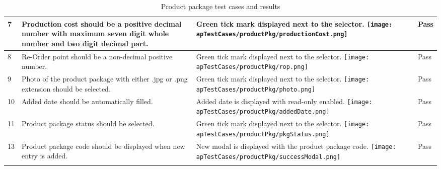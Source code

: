 \documentclass[12pt]{report}
\begin{document}
\begin{longtable}{ | p{1cm} | p{5cm} | p{5cm} | p{2cm} | }
	\hline
	7
	             &
	Production cost should be a positive decimal number with maximum seven digit whole number and two digit decimal part.
	             &
	Green tick mark displayed next to the selector.\newline
	\texttt{[image: apTestCases/productPkg/productionCost.png]}
	             &
	Pass                                                                      \\
	\hline
	8
	             &
	Re-Order point should be a non-decimal positive number.
	             &
	Green tick mark displayed next to the selector.\newline
	\texttt{[image: apTestCases/productPkg/rop.png]}
	             &
	Pass                                                                      \\
	\hline
	9
	             &
	Photo of the product package with either .jpg or .png extension should be selected.
	             &
	Green tick mark displayed next to the selector.\newline
	\texttt{[image: apTestCases/productPkg/photo.png]}
	             &
	Pass                                                                      \\
	\hline
	10
	             &
	Added date should be automatically filled.
	             &
	Added date is displayed with read-only enabled.\newline
	\texttt{[image: apTestCases/productPkg/addedDate.png]}
	             &
	Pass                                                                      \\
	\hline
	11
	             &
	Product package status should be selected.
	             &
	Green tick mark displayed next to the selector.\newline
	\texttt{[image: apTestCases/productPkg/pkgStatus.png]}
	             &
	Pass                                                                      \\
	\hline
	13
	             &
	Product package code should be displayed when new entry is added.
	             &
	New modal is displayed with the product package code.\newline
	\texttt{[image: apTestCases/productPkg/successModal.png]}
	             &
	Pass                                                                      \\
	\hline
	\caption{Product package test cases and results}
\end{longtable}
\end{document}
